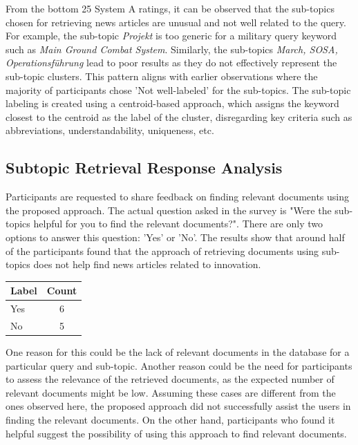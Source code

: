 From the bottom 25 System A ratings, it can be observed that the sub-topics chosen for retrieving news articles are unusual and not well related to the query. For example, the sub-topic \textit{Projekt} is too generic for a military query keyword such as \textit{Main Ground Combat System}. Similarly, the sub-topics \textit{March, SOSA, Operationsführung} lead to poor results as they do not effectively represent the sub-topic clusters. This pattern aligns with earlier observations where the majority of participants chose 'Not well-labeled' for the sub-topics. The sub-topic labeling is created using a centroid-based approach, which assigns the keyword closest to the centroid as the label of the cluster, disregarding key criteria such as abbreviations, understandability, uniqueness, etc.

\subsection{Subtopic Retrieval Response Analysis}

Participants are requested to share feedback on finding relevant documents using the proposed approach. The actual question asked in the survey is "Were the sub-topics helpful for you to find the relevant documents?". There are only two options to answer this question: 'Yes' or 'No'. The results show that around half of the participants found that the approach of retrieving documents using sub-topics does not help find news articles related to innovation.



\begin{center}
	\label{tab:question_5_results}
	\begin{tabularx}{.3\textwidth}{|Y|c|}
		\hline
		Label & Count \\
		\hline
		Yes & 6 \\
		\hline
		No & 5 \\
		\hline
	\end{tabularx}
\end{center} 

One reason for this could be the lack of relevant documents in the database for a particular query and sub-topic. Another reason could be the need for participants to assess the relevance of the retrieved documents, as the expected number of relevant documents might be low. Assuming these cases are different from the ones observed here, the proposed approach did not successfully assist the users in finding the relevant documents. On the other hand, participants who found it helpful suggest the possibility of using this approach to find relevant documents.

